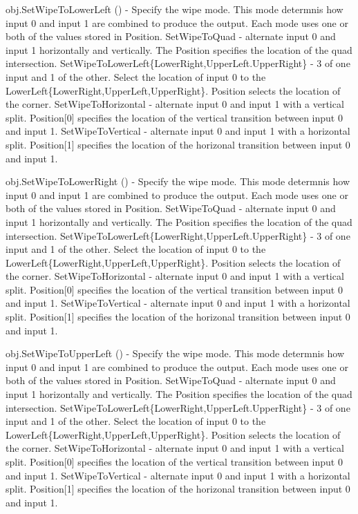 \begin{DoxyItemize}
\item {\ttfamily obj.\-Set\-Wipe\-To\-Lower\-Left ()} -\/ Specify the wipe mode. This mode determnis how input 0 and input 1 are combined to produce the output. Each mode uses one or both of the values stored in Position. Set\-Wipe\-To\-Quad -\/ alternate input 0 and input 1 horizontally and vertically. The Position specifies the location of the quad intersection. Set\-Wipe\-To\-Lower\-Left\{Lower\-Right,Upper\-Left.\-Upper\-Right\} -\/ 3 of one input and 1 of the other. Select the location of input 0 to the Lower\-Left\{Lower\-Right,Upper\-Left,Upper\-Right\}. Position selects the location of the corner. Set\-Wipe\-To\-Horizontal -\/ alternate input 0 and input 1 with a vertical split. Position\mbox{[}0\mbox{]} specifies the location of the vertical transition between input 0 and input 1. Set\-Wipe\-To\-Vertical -\/ alternate input 0 and input 1 with a horizontal split. Position\mbox{[}1\mbox{]} specifies the location of the horizonal transition between input 0 and input 1.  
\item {\ttfamily obj.\-Set\-Wipe\-To\-Lower\-Right ()} -\/ Specify the wipe mode. This mode determnis how input 0 and input 1 are combined to produce the output. Each mode uses one or both of the values stored in Position. Set\-Wipe\-To\-Quad -\/ alternate input 0 and input 1 horizontally and vertically. The Position specifies the location of the quad intersection. Set\-Wipe\-To\-Lower\-Left\{Lower\-Right,Upper\-Left.\-Upper\-Right\} -\/ 3 of one input and 1 of the other. Select the location of input 0 to the Lower\-Left\{Lower\-Right,Upper\-Left,Upper\-Right\}. Position selects the location of the corner. Set\-Wipe\-To\-Horizontal -\/ alternate input 0 and input 1 with a vertical split. Position\mbox{[}0\mbox{]} specifies the location of the vertical transition between input 0 and input 1. Set\-Wipe\-To\-Vertical -\/ alternate input 0 and input 1 with a horizontal split. Position\mbox{[}1\mbox{]} specifies the location of the horizonal transition between input 0 and input 1.  
\item {\ttfamily obj.\-Set\-Wipe\-To\-Upper\-Left ()} -\/ Specify the wipe mode. This mode determnis how input 0 and input 1 are combined to produce the output. Each mode uses one or both of the values stored in Position. Set\-Wipe\-To\-Quad -\/ alternate input 0 and input 1 horizontally and vertically. The Position specifies the location of the quad intersection. Set\-Wipe\-To\-Lower\-Left\{Lower\-Right,Upper\-Left.\-Upper\-Right\} -\/ 3 of one input and 1 of the other. Select the location of input 0 to the Lower\-Left\{Lower\-Right,Upper\-Left,Upper\-Right\}. Position selects the location of the corner. Set\-Wipe\-To\-Horizontal -\/ alternate input 0 and input 1 with a vertical split. Position\mbox{[}0\mbox{]} specifies the location of the vertical transition between input 0 and input 1. Set\-Wipe\-To\-Vertical -\/ alternate input 0 and input 1 with a horizontal split. Position\mbox{[}1\mbox{]} specifies the location of the horizonal transition between input 0 and input 1.  

\end{DoxyItemize}
